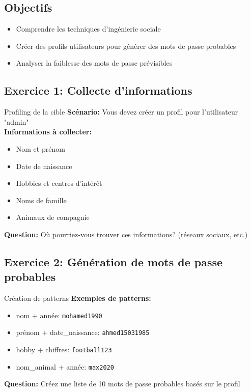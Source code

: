 \documentclass[12pt,a4paper]{article}
\begin{document}
\subsection{Objectifs}
\begin{itemize}
    \item Comprendre les techniques d'ingénierie sociale
    \item Créer des profils utilisateurs pour générer des mots de passe probables
    \item Analyser la faiblesse des mots de passe prévisibles
\end{itemize}

\subsection{Exercice 1: Collecte d'informations}

\begin{exercicebox}{Profiling de la cible}
\textbf{Scénario:} Vous devez créer un profil pour l'utilisateur "admin"\\
\textbf{Informations à collecter:}
\begin{itemize}
    \item Nom et prénom
    \item Date de naissance
    \item Hobbies et centres d'intérêt
    \item Noms de famille
    \item Animaux de compagnie
\end{itemize}
\textbf{Question:} Où pourriez-vous trouver ces informations? (réseaux sociaux, etc.)
\end{exercicebox}

\begin{answerbox}
\vspace{7cm}
\end{answerbox}

\subsection{Exercice 2: Génération de mots de passe probables}

\begin{exercicebox}{Création de patterns}
\textbf{Exemples de patterns:}
\begin{itemize}
    \item nom + année: \texttt{mohamed1990}
    \item prénom + date\_naissance: \texttt{ahmed15031985}
    \item hobby + chiffres: \texttt{football123}
    \item nom\_animal + année: \texttt{max2020}
\end{itemize}
\textbf{Question:} Créez une liste de 10 mots de passe probables basés sur le profil
\end{exercicebox}
\end{document}
